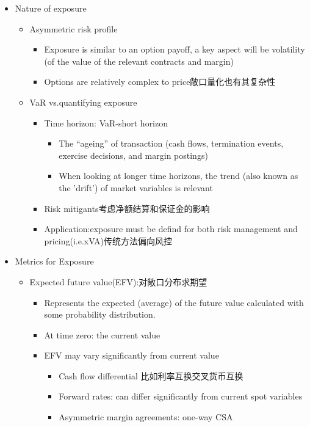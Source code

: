 \begin{itemize}
    \item Nature of exposure
    \begin{itemize}
        \item Asymmetric risk profile
        \begin{itemize}
        \item Exposure is similar to an option payoff, a key aspect will be volatility (of the value of the relevant contracts and margin)
        \item Options are relatively complex to price敞口量化也有其复杂性
        \end{itemize}
\item VaR vs.quantifying exposure
\begin{itemize}
    \item Time horizon: VaR-short horizon
    \begin{itemize}
    \item The “ageing” of transaction (cash flows, termination events, exercise decisions, and margin postings)
    \item When looking at longer time horizons, the trend (also known as the 'drift') of market variables is relevant
    \end{itemize}
    \item Risk mitigants考虑净额结算和保证金的影响
    \item Application:exposure must be defind for both risk management and pricing(i.e.xVA)传统方法偏向风控
\end{itemize}
    \end{itemize}
    

\item Metrics for Exposure
\begin{itemize}
\item Expected future value(EFV):对敞口分布求期望
\begin{itemize}
    \item Represents the expected (average) of the future value calculated with some probability distribution.
    \item At time zero: the current value
    \item EFV may vary significantly from current value
    \begin{itemize}
        \item Cash flow differential 比如利率互换交叉货币互换
        \item Forward rates: can differ significantly from current spot variables
        \item Asymmetric margin agreements: one-way CSA
    \end{itemize}
\end{itemize}
\end{itemize}



\end{itemize}

